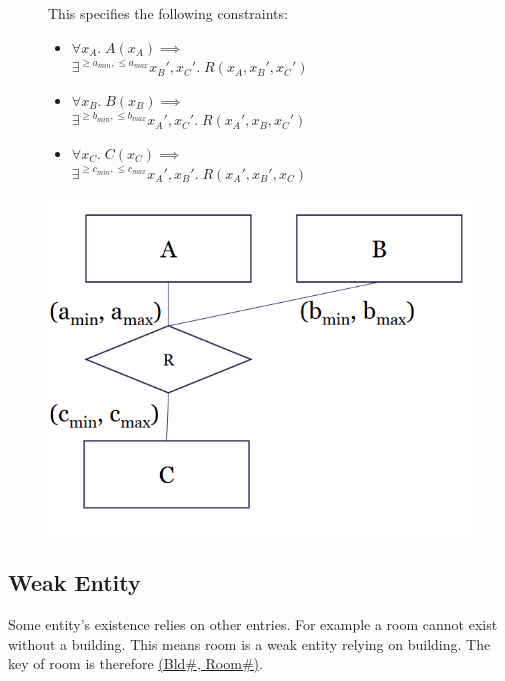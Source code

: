 \begin{figure}[H]
\begin{minipage}{.6\textwidth}
This specifies the following constraints:
\begin{itemize}
\item $\forall x_A.\;A(x_A) \implies$\\$ \exists^{\geq a_{min},\leq a_{max}} x_B',x_C'.\;R(x_A, x_B', x_C')$
\item $\forall x_B.\;B(x_B) \implies$\\$ \exists^{\geq b_{min},\leq b_{max}} x_A',x_C'.\;R(x_A', x_B, x_C')$
\item $\forall x_C.\;C(x_C) \implies$\\$ \exists^{\geq c_{min},\leq c_{max}} x_A',x_B'.\;R(x_A', x_B', x_C)$
\end{itemize}
\end{minipage}
\begin{minipage}{.4\textwidth}
\includegraphics[width=\textwidth]{images/expressive_cardinality.PNG}
\end{minipage}
\end{figure}

\subsection{Weak Entity}
Some entity's existence relies on other entries. For example a room cannot exist without a building. This means room is a weak entity relying on building. The key of room is therefore \underline{(Bld\#, Room\#)}. 

